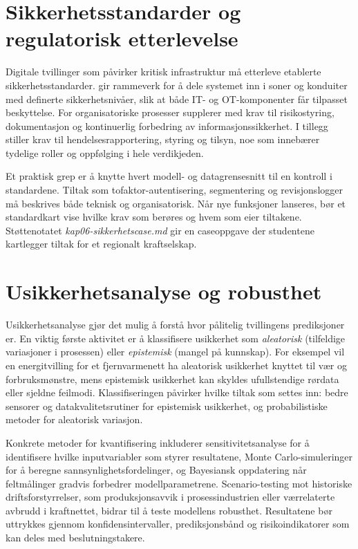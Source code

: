 \section{Sikkerhetsstandarder og regulatorisk etterlevelse}
Digitale tvillinger som påvirker kritisk infrastruktur må etterleve etablerte sikkerhetsstandarder. \citet{iec62443-2-1} gir rammeverk for å dele systemet inn i soner og konduiter med definerte sikkerhetsnivåer, slik at både IT- og OT-komponenter får tilpasset beskyttelse. For organisatoriske prosesser supplerer \citet{iso27001-2022} med krav til risikostyring, dokumentasjon og kontinuerlig forbedring av informasjonssikkerhet. I tillegg stiller \citet{eu2022nis2} krav til hendelsesrapportering, styring og tilsyn, noe som innebærer tydelige roller og oppfølging i hele verdikjeden.

Et praktisk grep er å knytte hvert modell- og datagrensesnitt til en kontroll i standardene. Tiltak som tofaktor-autentisering, segmentering og revisjonslogger må beskrives både teknisk og organisatorisk. Når nye funksjoner lanseres, bør et standardkart vise hvilke krav som berøres og hvem som eier tiltakene. Støttenotatet \textit{kap06-sikkerhetscase.md} gir en caseoppgave der studentene kartlegger tiltak for et regionalt kraftselskap.

\section{Usikkerhetsanalyse og robusthet}
Usikkerhetsanalyse gjør det mulig å forstå hvor pålitelig tvillingens prediksjoner er. En viktig første aktivitet er å klassifisere usikkerhet som \textit{aleatorisk} (tilfeldige variasjoner i prosessen) eller \textit{epistemisk} (mangel på kunnskap). For eksempel vil en energitvilling for et fjernvarmenett ha aleatorisk usikkerhet knyttet til vær og forbruksmønstre, mens epistemisk usikkerhet kan skyldes ufullstendige rørdata eller sjeldne feilmodi. Klassifiseringen påvirker hvilke tiltak som settes inn: bedre sensorer og datakvalitetsrutiner for epistemisk usikkerhet, og probabilistiske metoder for aleatorisk variasjon.

Konkrete metoder for kvantifisering inkluderer sensitivitetsanalyse for å identifisere hvilke inputvariabler som styrer resultatene, Monte Carlo-simuleringer for å beregne sannsynlighetsfordelinger, og Bayesiansk oppdatering når feltmålinger gradvis forbedrer modellparametrene. Scenario-testing mot historiske driftsforstyrrelser, som produksjonsavvik i prosessindustrien eller værrelaterte avbrudd i kraftnettet, bidrar til å teste modellens robusthet. Resultatene bør uttrykkes gjennom konfidensintervaller, prediksjonsbånd og risikoindikatorer som kan deles med beslutningstakere.

